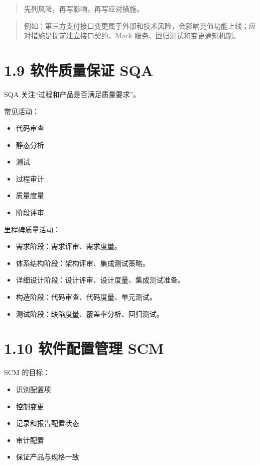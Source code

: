 \documentclass[UTF8,zihao=-4]{ctexart}
\begin{document}
\begin{quote}
先列风险，再写影响，再写应对措施。
\end{quote}
\begin{quote}
例如：第三方支付接口变更属于外部和技术风险，会影响充值功能上线；应对措施是提前建立接口契约、Mock 服务、回归测试和变更通知机制。
\end{quote}

\section{1.9 软件质量保证 SQA}

SQA 关注“过程和产品是否满足质量要求”。

常见活动：

\begin{itemize}
\item 代码审查
\item 静态分析
\item 测试
\item 过程审计
\item 质量度量
\item 阶段评审
\end{itemize}

里程碑质量活动：

\begin{itemize}
\item 需求阶段：需求评审、需求度量。
\item 体系结构阶段：架构评审、集成测试策略。
\item 详细设计阶段：设计评审、设计度量、集成测试准备。
\item 构造阶段：代码审查、代码度量、单元测试。
\item 测试阶段：缺陷度量、覆盖率分析、回归测试。
\end{itemize}

\section{1.10 软件配置管理 SCM}

SCM 的目标：

\begin{itemize}
\item 识别配置项
\item 控制变更
\item 记录和报告配置状态
\item 审计配置
\item 保证产品与规格一致
\end{itemize}
\end{document}
